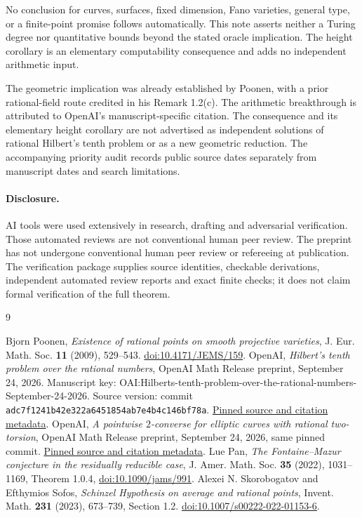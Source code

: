 \documentclass[11pt]{article}
\begin{document}
No conclusion for curves, surfaces, fixed dimension, Fano varieties,
general type, or a finite-point promise follows automatically. This note
asserts neither a Turing degree nor quantitative bounds beyond the stated
oracle implication. The height corollary is an elementary computability
consequence and adds no independent arithmetic input.

The geometric implication was already established by Poonen, with a
prior rational-field route credited in his Remark 1.2(c). The arithmetic
breakthrough is attributed to OpenAI's manuscript-specific citation.
The consequence and its elementary height corollary are not advertised
as independent solutions of rational Hilbert's tenth problem or as a
new geometric reduction. The accompanying priority audit records public
source dates separately from manuscript dates and search limitations.

\paragraph{Disclosure.}
AI tools were used extensively in research, drafting and adversarial
verification. Those automated reviews are not conventional human peer review.
The preprint has not undergone conventional human peer review or refereeing
at publication. The verification package supplies source identities,
checkable derivations, independent automated review reports and exact
finite checks; it does not claim formal verification of the full theorem.

\begin{thebibliography}{9}
\raggedright
{} Bjorn Poonen,
\emph{Existence of rational points on smooth projective varieties},
J. Eur. Math. Soc. \textbf{11} (2009), 529--543.
\href{https://doi.org/10.4171/JEMS/159}{doi:10.4171/JEMS/159}.
 OpenAI,
\emph{Hilbert's tenth problem over the rational numbers},
OpenAI Math Release preprint, September 24, 2026.
Manuscript key: OAI:Hilberts-tenth-problem-over-the-rational-numbers-September-24-2026.
Source version: commit \texttt{adc7f1241b42e322a6451854ab7e4b4c146bf78a}.
\href{https://github.com/openai/math/tree/adc7f1241b42e322a6451854ab7e4b4c146bf78a/preprints/Hilberts-tenth-problem-over-the-rational-numbers-September-24-2026}{Pinned source and citation metadata}.
 OpenAI,
\emph{A pointwise $2$-converse for elliptic curves with rational two-torsion},
OpenAI Math Release preprint, September 24, 2026, same pinned commit.
\href{https://github.com/openai/math/tree/adc7f1241b42e322a6451854ab7e4b4c146bf78a/preprints/A-pointwise-2-converse-for-elliptic-curves-with-rational-two-torsion-September-24-2026}{Pinned source and citation metadata}.
 Lue Pan,
\emph{The Fontaine--Mazur conjecture in the residually reducible case},
J. Amer. Math. Soc. \textbf{35} (2022), 1031--1169,
Theorem 1.0.4, \href{https://doi.org/10.1090/jams/991}{doi:10.1090/jams/991}.
 Alexei N. Skorobogatov and Efthymios Sofos,
\emph{Schinzel Hypothesis on average and rational points},
Invent. Math. \textbf{231} (2023), 673--739, Section 1.2.
\href{https://doi.org/10.1007/s00222-022-01153-6}{doi:10.1007/s00222-022-01153-6}.
\end{thebibliography}
\end{document}

